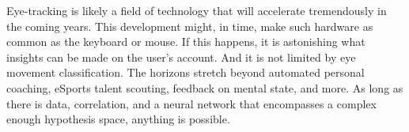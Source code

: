 Eye-tracking is likely a field of technology that will accelerate tremendously in the coming years. This development might, in time, make such hardware as common as the keyboard or mouse. If this happens, it is astonishing what insights can be made on the user's account. And it is not limited by eye movement classification. The horizons stretch beyond automated personal coaching, eSports talent scouting, feedback on mental state, and more. As long as there is data, correlation, and a neural network that encompasses a complex enough hypothesis space, anything is possible. 